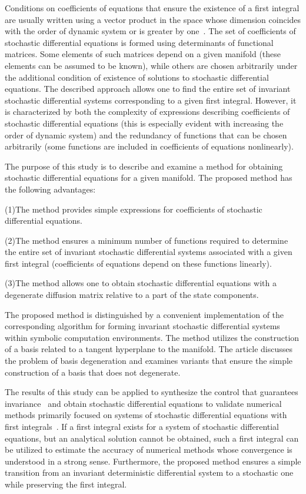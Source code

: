 \documentclass[10pt,reqno]{amsart}
\theoremstyle{plain}
\theoremstyle{remark}
\begin{document}
Conditions on coefficients of equations that ensure the existence of a first integral are usually written using a vector product in the space whose dimension coincides with the order of dynamic system or is greater by one~\cite{Dub_89, Kar_15, Kar_21}. The set of coefficients of stochastic differential equations is formed using determinants of functional matrices. Some elements of such matrices depend on a given manifold (these elements can be assumed to be known), while others are chosen arbitrarily under the additional condition of existence of solutions to stochastic differential equations. The described approach allows one to find the entire set of invariant stochastic differential systems corresponding to a given first integral. However, it is characterized by both the complexity of expressions describing coefficients of stochastic differential equations (this is especially evident with increasing the order of dynamic system) and the redundancy of functions that can be chosen arbitrarily (some functions are included in coefficients of equations nonlinearly).

The purpose of this study is to describe and examine a method for obtaining stochastic differential equations for a given manifold. The proposed method has the following advantages:

(1)\;The method provides simple expressions for coefficients of stochastic differential equations.

(2)\;The method ensures a minimum number of functions required to determine the entire set of invariant stochastic differential systems associated with a given first integral (coefficients of equations depend on these functions linearly).

(3)\;The method allows one to obtain stochastic differential equations with a degenerate diffusion matrix relative to a part of the state components.

The proposed method is distinguished by a convenient implementation of the corresponding algorithm for forming invariant stochastic differential systems within symbolic computation environments. The method utilizes the construction of a basis related to a tangent hyperplane to the manifold. The article discusses the problem of basis degeneration and examines variants that ensure the simple construction of a basis that does not degenerate.

The results of this study can be applied to synthesize the control that guarantees invariance~\cite{Kar_15, Kar_21} and obtain stochastic differential equations to validate numerical methods primarily focused on systems of stochastic differential equations with first integrals~\cite{AveRyb_SJVM19, ArmKing_PRSA22, BurBurLyt_NA22, SchHerStuWar_FCM25}. If a first integral exists for a system of stochastic differential equations, but an analytical solution cannot be obtained, such a first integral can be utilized to estimate the accuracy of numerical methods whose convergence is understood in a strong sense. Furthermore, the proposed method ensures a simple transition from an invariant deterministic differential system to a stochastic one while preserving the first integral.
\end{document}
